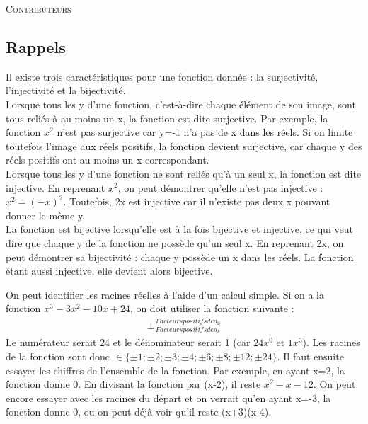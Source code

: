 \documentclass[10pt, french]{article}
\begin{document}
\begin{center}
	\textsc{\Large Contributeurs}\\[0.5cm] 
\end{center}

\newpage

\raggedcolumns

\begin{multicols*}{2}
\section{Rappels}
\begin{definitionNOHFILL}
Il existe trois caractéristiques pour une fonction donnée : la surjectivité, l'injectivité et la bijectivité.\\

Lorsque tous les y d'une fonction, c'est-à-dire chaque élément de son image, sont tous reliés à au moins un x, la fonction est dite surjective. Par exemple, la fonction $x^{2}$ n'est pas surjective car y=-1 n'a pas de x dans les réels. Si on limite toutefois l'image aux réels positifs, la fonction devient surjective, car chaque y des réels positifs ont au moins un x correspondant.\\

Lorsque tous les y d'une fonction ne sont reliés qu'à un seul x, la fonction est dite injective. En reprenant $x^{2}$, on peut démontrer qu'elle n'est pas injective : $x^{2}=(-x)^{2}$. Toutefois, 2x est injective car il n'existe pas deux x pouvant donner le même y.\\

La fonction est bijective lorsqu'elle est à la fois bijective et injective, ce qui veut dire que chaque y de la fonction ne possède qu'un seul x. En reprenant 2x, on peut démontrer sa bijectivité : chaque y possède un x dans les réels. La fonction étant aussi injective, elle devient alors bijective.
\end{definitionNOHFILL}
\begin{definitionNOHFILL}
On peut identifier les racines réelles à l'aide d'un calcul simple. Si on a la fonction $ x^{3}-3x^{2}-10x+24 $, on doit utiliser la fonction suivante :\\
  \begin{align*}
			\pm \frac{Facteurs positifs de a_0}{Facteurs positifs de a_k}
	\end{align*}
Le numérateur serait 24 et le dénominateur serait 1 (car $24x^{0}$ et $1x^{3}$). Les racines de la fonction sont donc $\in \{ {\pm 1; \pm 2; \pm 3; \pm 4; \pm 6; \pm 8; \pm 12; \pm 24} \}$. Il faut ensuite essayer les chiffres de l'ensemble de la fonction. Par exemple, en ayant x=2, la fonction donne 0. En divisant la fonction par (x-2), il reste $x^{2}-x-12$. On peut encore essayer avec les racines du départ et on verrait qu'en ayant x=-3, la fonction donne 0, ou on peut déjà voir qu'il reste (x+3)(x-4).
\end{definitionNOHFILL}


\end{multicols*}
\end{document}
